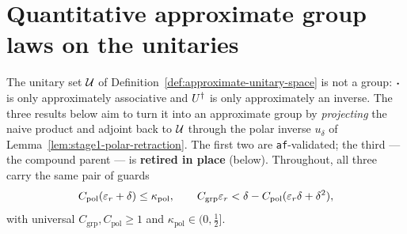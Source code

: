 \section{Quantitative approximate group laws on the unitaries}\label{sec:stage1-group-laws}

The unitary set $\mathcal U$ of Definition~\ref{def:approximate-unitary-space} is not a group:
$\mathbin{\bm{\cdot}}$ is only approximately associative and $U^{\dagger}$ is only approximately an inverse.
The three results below aim to turn it into an approximate group by \emph{projecting} the
naive product and adjoint back to $\mathcal U$ through the polar inverse $u_\delta$ of
Lemma~\ref{lem:stage1-polar-retraction}. The first two are \texttt{af}-validated; the third
--- the compound parent --- is \textbf{retired in place} (below). Throughout, all three
carry the same pair of guards
\begin{equation}\label{eq:s1gl-guards}
  C_{\mathrm{pol}}(\varepsilon_r+\delta)\le\kappa_{\mathrm{pol}},
  \qquad
  C_{\mathrm{grp}}\varepsilon_r<\delta-C_{\mathrm{pol}}(\varepsilon_r\delta+\delta^{2}),
\end{equation}
with universal $C_{\mathrm{grp}},C_{\mathrm{pol}}\ge1$ and
$\kappa_{\mathrm{pol}}\in(0,\tfrac12]$.

